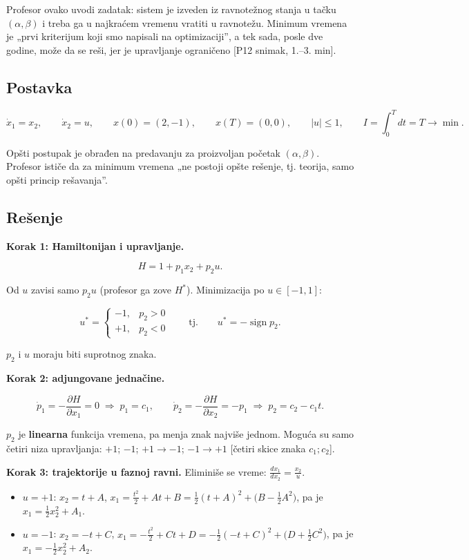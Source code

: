 \documentclass[11pt,a4paper,parskip=half,headsepline,numbers=noenddot]{scrartcl}
\DeclareRobustCommand{\izvor}[1]{{\small\color{izvorC}[#1]}}
\begin{document}
Profesor ovako uvodi zadatak: sistem je izveden iz ravnotežnog stanja u tačku \((\alpha, \beta)\) i treba ga u najkraćem vremenu vratiti u ravnotežu. Minimum vremena je „prvi kriterijum koji smo napisali na optimizaciji'', a tek sada, posle dve godine, može da se reši, jer je upravljanje ograničeno \izvor{P12 snimak, 1.--3. min}.

\subsection{Postavka}

\[\dot x_1 = x_2, \qquad \dot x_2 = u, \qquad x(0) = (2, -1), \qquad x(T) = (0, 0), \qquad |u| \le 1, \qquad I = \int_0^T dt = T \to \min .\]

Opšti postupak je obrađen na predavanju za proizvoljan početak \((\alpha, \beta)\). Profesor ističe da za minimum vremena „ne postoji opšte rešenje, tj. teorija, samo opšti princip rešavanja''.

\subsection{Rešenje}

\textbf{Korak 1: Hamiltonijan i upravljanje.}

\[H = 1 + p_1x_2 + p_2u .\]

Od \(u\) zavisi samo \(p_2u\) (profesor ga zove \(H^*\)). Minimizacija po \(u \in [-1, 1]\):

\[u^* = \begin{cases} -1, & p_2 > 0 \\ +1, & p_2 < 0 \end{cases} \qquad\text{tj.}\qquad u^* = -\operatorname{sign}p_2 .\]

\(p_2\) i \(u\) moraju biti suprotnog znaka.

\textbf{Korak 2: adjungovane jednačine.}

\[\dot p_1 = -\frac{\partial H}{\partial x_1} = 0 \;\Rightarrow\; p_1 = c_1, \qquad \dot p_2 = -\frac{\partial H}{\partial x_2} = -p_1 \;\Rightarrow\; p_2 = c_2 - c_1t .\]

\(p_2\) je \textbf{linearna} funkcija vremena, pa menja znak najviše jednom. Moguća su samo četiri niza upravljanja: \(+1\); \(-1\); \(+1 \to -1\); \(-1 \to +1\) {[}četiri skice znaka \(c_1; c_2\){]}.

\textbf{Korak 3: trajektorije u faznoj ravni.} Eliminiše se vreme: \(\frac{dx_1}{dx_2} = \frac{x_2}{u}\).

\begin{itemize}
\item \(u = +1\): \(x_2 = t + A\), \(x_1 = \frac{t^2}{2} + At + B = \frac12(t + A)^2 + \big(B - \frac12A^2\big)\), pa je \(x_1 = \frac12x_2^2 + A_1\).
\item \(u = -1\): \(x_2 = -t + C\), \(x_1 = -\frac{t^2}{2} + Ct + D = -\frac12(-t + C)^2 + \big(D + \frac12C^2\big)\), pa je \(x_1 = -\frac12x_2^2 + A_2\).
\end{itemize}
\end{document}
